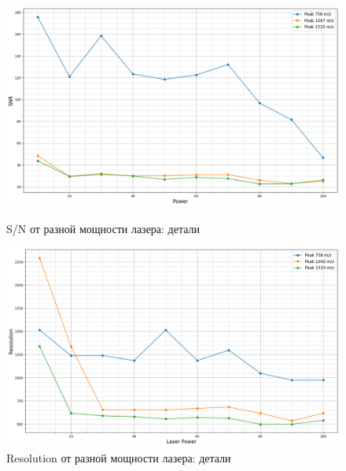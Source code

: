 \documentclass{article}
\begin{document}
\begin{figure}[h!] 
        \centering
        \centering
            \includegraphics[width=0.9\linewidth]{Images/SNR_power_linear_details.png}
                 \caption{S/N от разной мощности лазера: детали}
                 \label{Ещё детали}
        \endminipage\hfill
        \centering
             \includegraphics[width=0.9\linewidth]{Images/Resolution_power_linear_details.png}
                 \caption{Resolution от разной мощности лазера: детали}
                 \label{Детали}
        \endminipage
\end{figure}
\end{document}

